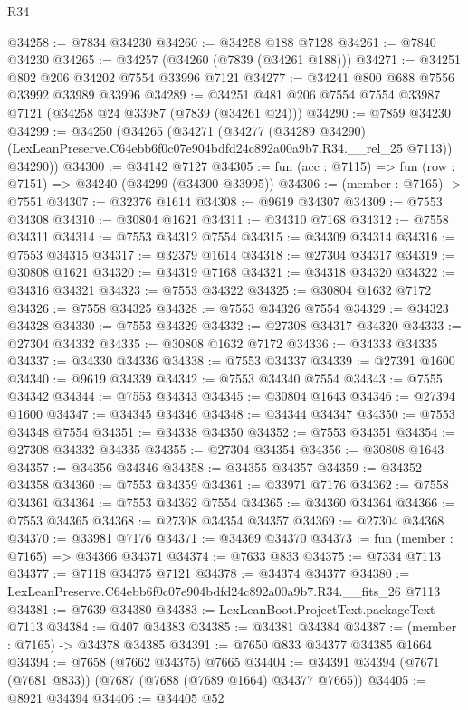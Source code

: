 \begin{lexlean}{R34}
\begin{coremodule}
@34258 := @7834 @34230
@34260 := @34258 @188 @7128
@34261 := @7840 @34230
@34265 := @34257 (@34260 (@7839 (@34261 @188)))
@34271 := @34251 @802 @206 @34202 @7554 @33996 @7121
@34277 := @34241 @800 @688 @7556 @33992 @33989 @33996
@34289 := @34251 @481 @206 @7554 @7554 @33987 @7121 (@34258 @24 @33987 (@7839 (@34261 @24)))
@34290 := @7859 @34230
@34299 := @34250
    (@34265
      (@34271
        (@34277
          (@34289 @34290)
          (LexLeanPreserve.C64ebb6f0c07e904bdfd24c892a00a9b7.R34.__rel_25 @7113))
        @34290))
@34300 := @34142 @7127
@34305 := fun (acc : @7115) => fun (row : @7151) => @34240 (@34299 (@34300 @33995))
@34306 := (member : @7165) -> @7551
@34307 := @32376 @1614
@34308 := @9619 @34307
@34309 := @7553 @34308
@34310 := @30804 @1621
@34311 := @34310 @7168
@34312 := @7558 @34311
@34314 := @7553 @34312 @7554
@34315 := @34309 @34314
@34316 := @7553 @34315
@34317 := @32379 @1614
@34318 := @27304 @34317
@34319 := @30808 @1621
@34320 := @34319 @7168
@34321 := @34318 @34320
@34322 := @34316 @34321
@34323 := @7553 @34322
@34325 := @30804 @1632 @7172
@34326 := @7558 @34325
@34328 := @7553 @34326 @7554
@34329 := @34323 @34328
@34330 := @7553 @34329
@34332 := @27308 @34317 @34320
@34333 := @27304 @34332
@34335 := @30808 @1632 @7172
@34336 := @34333 @34335
@34337 := @34330 @34336
@34338 := @7553 @34337
@34339 := @27391 @1600
@34340 := @9619 @34339
@34342 := @7553 @34340 @7554
@34343 := @7555 @34342
@34344 := @7553 @34343
@34345 := @30804 @1643
@34346 := @27394 @1600
@34347 := @34345 @34346
@34348 := @34344 @34347
@34350 := @7553 @34348 @7554
@34351 := @34338 @34350
@34352 := @7553 @34351
@34354 := @27308 @34332 @34335
@34355 := @27304 @34354
@34356 := @30808 @1643
@34357 := @34356 @34346
@34358 := @34355 @34357
@34359 := @34352 @34358
@34360 := @7553 @34359
@34361 := @33971 @7176
@34362 := @7558 @34361
@34364 := @7553 @34362 @7554
@34365 := @34360 @34364
@34366 := @7553 @34365
@34368 := @27308 @34354 @34357
@34369 := @27304 @34368
@34370 := @33981 @7176
@34371 := @34369 @34370
@34373 := fun (member : @7165) => @34366 @34371
@34374 := @7633 @833
@34375 := @7334 @7113
@34377 := @7118 @34375 @7121
@34378 := @34374 @34377
@34380 := LexLeanPreserve.C64ebb6f0c07e904bdfd24c892a00a9b7.R34.__fits_26 @7113
@34381 := @7639 @34380
@34383 := LexLeanBoot.ProjectText.packageText @7113
@34384 := @407 @34383
@34385 := @34381 @34384
@34387 := (member : @7165) -> @34378 @34385
@34391 := @7650 @833 @34377 @34385 @1664
@34394 := @7658 (@7662 @34375) @7665
@34404 := @34391 @34394 (@7671 (@7681 @833)) (@7687 (@7688 (@7689 @1664) @34377 @7665))
@34405 := @8921 @34394
@34406 := @34405 @52

\end{coremodule}
\end{lexlean}
